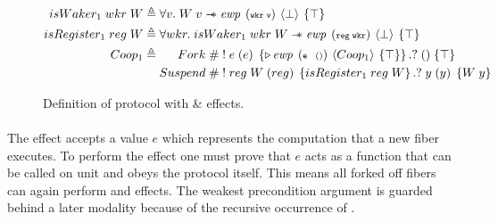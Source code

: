 \begin{figure}[ht]
  \begin{align*}
    \gsIsWaker{1}\; wkr\; W & \triangleq \forall v.   \;  W\; v \wand{} \ewp{wkr\; v}{\bot}{\top}\label{spec:is_waker}                                                  \\
    \gsIsReg{1}\; reg\; W   & \triangleq \forall wkr. \; \gsIsWaker{1}\; wkr\; W \wand{} \ewp{reg\; wkr}{\bot}{\top}                                                    \\
    \proto{1}               & \triangleq \begin{aligned}[t]
                                           Fork\;    & \# \; !\; e\; (e)\; \left\{\later \ewp{e\ \ ()}{\proto{1}}{\top}\right\}. ?\; ()\; \{ \top \}         \\
                                           Suspend\; & \# \; !\; reg\; W\; (reg)\; \left\{\gsIsReg{1}\; reg\; W\right\}.?\; y\; (y)\; \left\{ W\; y \right\}
                                         \end{aligned}
  \end{align*}
  \caption{Definition of  protocol with \efork{} \& \esuspend{} effects.}
  \label{fig:coop-protocol-1}\label{spec:suspend}
\end{figure}

\paragraph*{\efork{}}
The \efork{} effect accepts a value \(e\) which represents the computation that a new fiber executes.
To perform the effect one must prove that \(e\) acts as a function that can be called on unit and obeys the  protocol itself.
This means all forked off fibers can again perform \efork{} and \esuspend{} effects.
The weakest precondition argument is guarded behind a later modality because of the recursive occurrence of .

